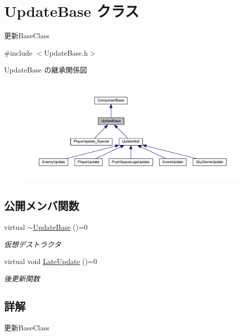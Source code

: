 \hypertarget{class_update_base}{}\section{Update\+Base クラス}
\label{class_update_base}


更新\+Base\+Class  




{\ttfamily \#include $<$Update\+Base.\+h$>$}



Update\+Base の継承関係図\nopagebreak
\begin{figure}[H]
\begin{center}
\leavevmode
\includegraphics[width=350pt]{class_update_base__inherit__graph}
\end{center}
\end{figure}
\subsection*{公開メンバ関数}
\begin{DoxyCompactItemize}
\item 
virtual \mbox{\hyperlink{class_update_base_a70fbdbeb1a3c9181d9e9190cd661907c}{$\sim$\+Update\+Base}} ()=0
\begin{DoxyCompactList}\small\item\em 仮想デストラクタ \end{DoxyCompactList}\item 
virtual void \mbox{\hyperlink{class_update_base_afc4956f78135aed5fc4e4f9991be50b9}{Late\+Update}} ()=0
\begin{DoxyCompactList}\small\item\em 後更新関数 \end{DoxyCompactList}\end{DoxyCompactItemize}


\subsection{詳解}
更新\+Base\+Class 

